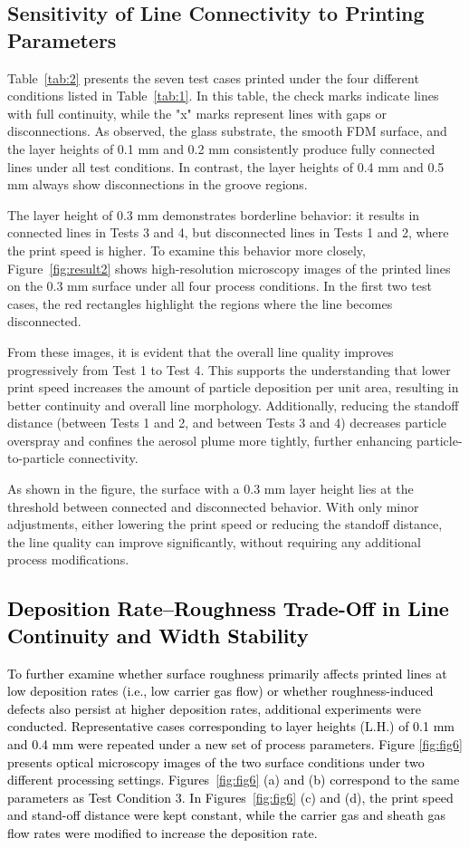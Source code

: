 \documentclass[subscriptcorrection,upint,varvw,balance,hyphenate]{asmejour}
\newcommand{\rev}[1]{\textcolor{black}{#1\xspace}}
\begin{document}
\subsection{Sensitivity of Line Connectivity to Printing Parameters}
Table~\ref{tab:2} presents the seven test cases printed under the four different conditions listed in Table~\ref{tab:1}. In this table, the check marks indicate lines with full continuity, while the "x" marks represent lines with gaps or disconnections. As observed, the glass substrate, the smooth FDM surface, and the layer heights of 0.1 mm and 0.2 mm consistently produce fully connected lines under all test conditions. In contrast, the layer heights of 0.4 mm and 0.5 mm always show disconnections in the groove regions.

The layer height of 0.3 mm demonstrates borderline behavior: it results in connected lines in Tests 3 and 4, but disconnected lines in Tests 1 and 2, where the print speed is higher. To examine this behavior more closely, Figure~\ref{fig:result2} shows high-resolution microscopy images of the printed lines on the 0.3 mm surface under all four process conditions. In the first two test cases, the red rectangles highlight the regions where the line becomes disconnected.

From these images, it is evident that the overall line quality improves progressively from Test 1 to Test 4. This supports the understanding that lower print speed increases the amount of particle deposition per unit area, resulting in better continuity and overall line morphology. Additionally, reducing the standoff distance (between Tests 1 and 2, and between Tests 3 and 4) decreases particle overspray and confines the aerosol plume more tightly, further enhancing particle-to-particle connectivity.

As shown in the figure, the surface with a 0.3 mm layer height lies at the threshold between connected and disconnected behavior. With only minor adjustments, either lowering the print speed or reducing the standoff distance, the line quality can improve significantly, without requiring any additional process modifications.


\subsection{\rev{Deposition Rate–Roughness Trade-Off in Line Continuity and Width Stability}}

\rev{To further examine whether surface roughness primarily affects printed lines at low deposition rates (i.e., low carrier gas flow) or whether roughness-induced defects also persist at higher deposition rates, additional experiments were conducted. Representative cases corresponding to layer heights (L.H.) of 0.1 mm and 0.4 mm were repeated under a new set of process parameters. Figure \ref{fig:fig6} presents optical microscopy images of the two surface conditions under two different processing settings. Figures~\ref{fig:fig6} (a) and (b) correspond to the same parameters as Test Condition 3. In Figures~\ref{fig:fig6} (c) and (d), the print speed and stand-off distance were kept constant, while the carrier gas and sheath gas flow rates were modified to increase the deposition rate.}
\end{document}
